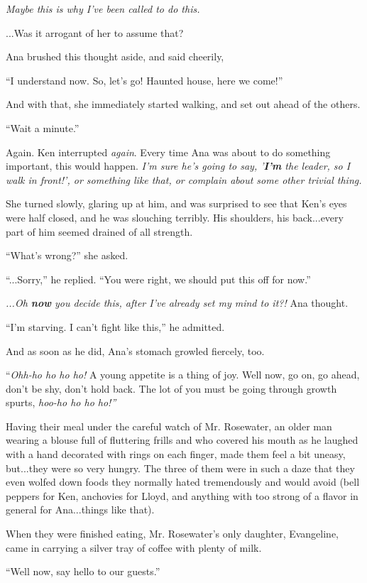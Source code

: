 \documentclass[
]{article}
\begin{document}
\emph{Maybe this is why I've been called to do this.}

...Was it arrogant of her to assume that?

Ana brushed this thought aside, and said cheerily,

``I understand now. So, let's go! Haunted house, here we come!''

And with that, she immediately started walking, and set out ahead of the
others.

``Wait a minute.''

Again. Ken interrupted \emph{again}. Every time Ana was about to do
something important, this would happen. \emph{I'm sure he's going to
say, '\textbf{I'm} the leader, so I walk in front!', or something like
that, or complain about some other trivial thing.}

She turned slowly, glaring up at him, and was surprised to see that
Ken's eyes were half closed, and he was slouching terribly. His
shoulders, his back...every part of him seemed drained of all strength.

``What's wrong?'' she asked.

``...Sorry,'' he replied. ``You were right, we should put this off for
now.''

\emph{...Oh \textbf{now} you decide this, after I've already set my mind
to it?! }Ana thought.

``I'm starving. I can't fight like this,'' he admitted.

And as soon as he did, Ana's stomach growled fiercely, too.

``\emph{Ohh-ho ho ho ho!} A young appetite is a thing of joy. Well now,
go on, go ahead, don't be shy, don't hold back. The lot of you must be
going through growth spurts, \emph{hoo-ho ho ho ho!''}

Having their meal under the careful watch of Mr. Rosewater, an older man
wearing a blouse full of fluttering frills and who covered his mouth as
he laughed with a hand decorated with rings on each finger, made them
feel a bit uneasy, but...they were so very hungry. The three of them
were in such a daze that they even wolfed down foods they normally hated
tremendously and would avoid (bell peppers for Ken, anchovies for Lloyd,
and anything with too strong of a flavor in general for Ana...things
like that).

When they were finished eating, Mr. Rosewater's only daughter,
Evangeline, came in carrying a silver tray of coffee with plenty of
milk.

``Well now, say hello to our guests.''
\end{document}
